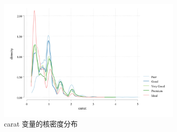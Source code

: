 \documentclass[]{ctexbook}
\begin{document}
\begin{figure}

{\centering \includegraphics[width=0.8\textwidth]{assets/kdensitycarat} 

}

\caption{carat 变量的核密度分布}\label{fig:kdensitycarat}
\end{figure}



\backmatter
\printindex
\end{document}
